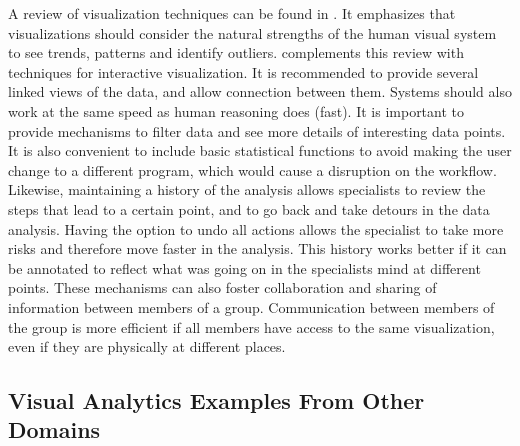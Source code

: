 A review of visualization techniques can be found in \autocite{heer_tour_2010}. It emphasizes that visualizations should consider the natural strengths of the human visual system to see trends, patterns and identify outliers. \autocite{heer_interactive_2012} complements this review with techniques for interactive visualization. It is recommended to provide several linked views of the data, and allow connection between them. Systems should also work at the same speed as human reasoning does (fast). It is important to provide mechanisms to filter data and see more details of interesting data points. It is also convenient to include basic statistical functions to avoid making the user change to a different program, which would cause a disruption on the workflow. Likewise, maintaining a history of the analysis allows specialists to review the steps that lead to a certain point, and to go back and take detours in the data analysis. Having the option to undo all actions allows the specialist to take more risks and therefore move faster in the analysis. This history works better if it can be annotated to reflect what was going on in the specialists mind at different points. These mechanisms can also foster collaboration and sharing of information between members of a group. Communication between members of the group is more efficient if all members have access to the same visualization, even if they are physically at different places.







\subsection{Visual Analytics Examples From Other Domains}

